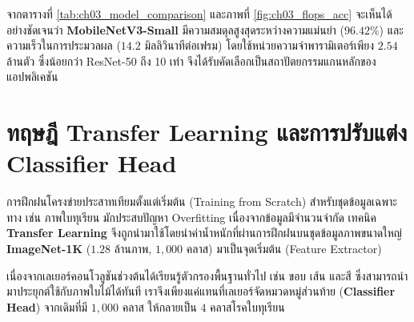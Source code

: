 จากตารางที่ \ref{tab:ch03_model_comparison} และภาพที่ \ref{fig:ch03_flops_acc} จะเห็นได้อย่างชัดเจนว่า \textbf{MobileNetV3-Small} มีความสมดุลสูงสุดระหว่างความแม่นยำ ($96.42\%$) และความเร็วในการประมวลผล ($14.2$ มิลลิวินาทีต่อเฟรม) โดยใช้หน่วยความจำพารามิเตอร์เพียง $2.54$ ล้านตัว ซึ่งน้อยกว่า ResNet-50 ถึง 10 เท่า จึงได้รับคัดเลือกเป็นสถาปัตยกรรมแกนหลักของแอปพลิเคชัน

\section{ทฤษฎี Transfer Learning และการปรับแต่ง Classifier Head}

การฝึกฝนโครงข่ายประสาทเทียมตั้งแต่เริ่มต้น (Training from Scratch) สำหรับชุดข้อมูลเฉพาะทาง เช่น ภาพใบทุเรียน มักประสบปัญหา Overfitting เนื่องจากข้อมูลมีจำนวนจำกัด เทคนิค \textbf{Transfer Learning} จึงถูกนำมาใช้โดยนำค่าน้ำหนักที่ผ่านการฝึกฝนบนชุดข้อมูลภาพขนาดใหญ่ \textbf{ImageNet-1K} ($1.28$ ล้านภาพ, $1,000$ คลาส) มาเป็นจุดเริ่มต้น (Feature Extractor)

เนื่องจากเลเยอร์คอนโวลูชันช่วงต้นได้เรียนรู้ตัวกรองพื้นฐานทั่วไป เช่น ขอบ เส้น และสี ซึ่งสามารถนำมาประยุกต์ใช้กับภาพใบไม้ได้ทันที เราจึงเพียงแค่แทนที่เลเยอร์จัดหมวดหมู่ส่วนท้าย (\textbf{Classifier Head}) จากเดิมที่มี $1,000$ คลาส ให้กลายเป็น $4$ คลาสโรคใบทุเรียน

